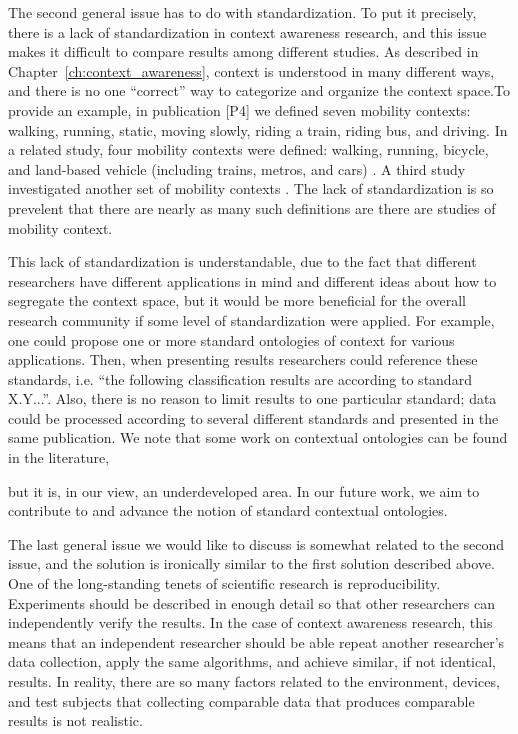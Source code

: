The second general issue has to do with standardization. To put it precisely, there is a lack of standardization in context awareness research, and this issue makes it difficult to compare results among different studies. As described in Chapter~\ref{ch:context_awareness}, context is understood in many different ways, and there is no one ``correct'' way to categorize and organize the context space.To provide an example, in publication [P4] we defined seven mobility contexts: walking, running, static, moving slowly, riding a train, riding bus, and driving. In a related study, four mobility contexts were defined: walking, running, bicycle, and land-based vehicle (including trains, metros, and cars) \cite{elhoushi2014robust}. A third study investigated another set of mobility contexts \cite{stenneth2014detecting}. The lack of standardization is so prevelent that there are nearly as many such definitions are there are studies of mobility context.

This lack of standardization is understandable, due to the fact that different researchers have different applications in mind and different ideas about how to segregate the context space, but it would be more beneficial for the overall research community if some level of standardization were applied. For example, one could propose one or more standard ontologies of context for various applications. Then, when presenting results researchers could reference these standards, i.e. ``the following classification results are according to standard X.Y...''. Also, there is no reason to limit results to one particular standard; data could be processed according to several different standards and presented in the same publication. We note that some work on contextual ontologies can be found in the literature, %
%



but it is, in our view, an underdeveloped area. In our future work, we aim to contribute to and advance the notion of standard contextual ontologies.

The last general issue we would like to discuss is somewhat related to the second issue, and the solution is ironically similar to the first solution described above. One of the long-standing tenets of scientific research is reproducibility. Experiments should be described in enough detail so that other researchers can independently verify the results. In the case of context awareness research, this means that an independent researcher should be able repeat another researcher's data collection, apply the same algorithms, and achieve similar, if not identical, results. In reality, there are so many factors related to the environment, devices, and test subjects that collecting comparable data that produces comparable results is not realistic.


